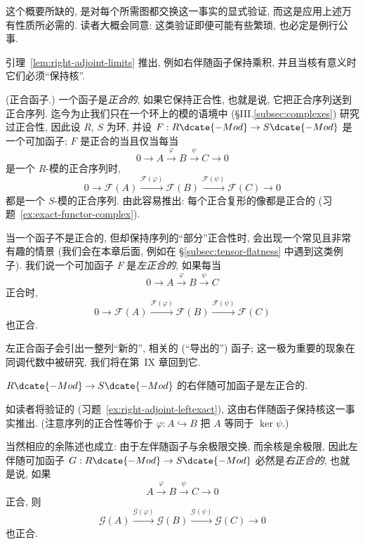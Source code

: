 这个概要所缺的, 是对每个所需图都交换这一事实的显式验证, 而这是应用上述万有性质所必需的. 读者大概会同意: 这类验证即便可能有些繁琐, 也必定是例行公事.

引理~\ref{lem:right-adjoint-limits} 推出, 例如右伴随函子保持乘积, 并且当核有意义时它们必须``保持核''.

\begin{example}\label{ex:exact-functors}
(正合函子.) 一个函子是\emph{正合的}, 如果它保持正合性, 也就是说, 它把正合序列送到正合序列. 迄今为止我们只在一个环上的模的语境中 (§III.\ref{subsec:complexes}) 研究过正合性, 因此设 $R$, $S$ 为环, 并设 $F:R\dcate{-Mod}\to S\dcate{-Mod}$ 是一个可加函子; $F$ 是正合的当且仅当每当
\[
0\longrightarrow A\xrightarrow{\varphi}B\xrightarrow{\psi}C\longrightarrow 0
\]
是一个 $R$-模的正合序列时,
\[
0\longrightarrow\mathcal{F}(A)\xrightarrow{\mathcal{F}(\varphi)}\mathcal{F}(B)\xrightarrow{\mathcal{F}(\psi)}\mathcal{F}(C)\longrightarrow 0
\]
都是一个 $S$-模的正合序列. 由此容易推出: 每个正合复形的像都是正合的 (习题~\ref{ex:exact-functor-complex}).

当一个函子不是正合的, 但却保持序列的``部分''正合性时, 会出现一个常见且非常有趣的情景 (我们会在本章后面, 例如在 §\ref{subsec:tensor-flatness} 中遇到这类例子). 我们说一个可加函子 $F$ 是\emph{左正合的}, 如果每当
\[
0\longrightarrow A\xrightarrow{\varphi}B\xrightarrow{\psi}C
\]
正合时,
\[
0\longrightarrow\mathcal{F}(A)\xrightarrow{\mathcal{F}(\varphi)}\mathcal{F}(B)\xrightarrow{\mathcal{F}(\psi)}\mathcal{F}(C)
\]
也正合.

左正合函子会引出一整列``新的'', 相关的 (``导出的'') 函子; 这一极为重要的现象在同调代数中被研究, 我们将在第~IX 章回到它.
\end{example}

\begin{claim}\label{claim:right-adjoint-leftexact}
$R\dcate{-Mod}\to S\dcate{-Mod}$ 的右伴随可加函子是左正合的.
\end{claim}

如读者将验证的 (习题~\ref{ex:right-adjoint-leftexact}), 这由右伴随函子保持核这一事实推出. (注意序列的正合性等价于 $\varphi:A\hookrightarrow B$ 把 $A$ 等同于 $\ker\psi$.)

当然相应的余陈述也成立: 由于左伴随函子与余极限交换, 而余核是余极限, 因此左伴随可加函子 $G:R\dcate{-Mod}\to S\dcate{-Mod}$ 必然是\emph{右正合的}, 也就是说, 如果
\[
A\xrightarrow{\varphi}B\xrightarrow{\psi}C\longrightarrow 0
\]
正合, 则
\[
\mathcal{G}(A)\xrightarrow{\mathcal{G}(\varphi)}\mathcal{G}(B)\xrightarrow{\mathcal{G}(\psi)}\mathcal{G}(C)\longrightarrow 0
\]
也正合.

